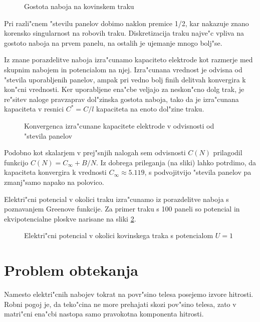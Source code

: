 \documentclass[a4paper,10pt]{article}
\begin{document}
\begin{figure}[H]

\caption{Gostota naboja na kovinskem traku}
\label{fig:trak-naboj-log}
\end{figure}

Pri razli"cnem "stevilu panelov dobimo naklon premice 1/2, kar nakazuje znano korensko singularnost na robovih traku. Diskretizacija traku najve"c vpliva na gostoto naboja na prvem panelu, na ostalih je ujemanje mnogo bolj"se. 

Iz znane porazdelitve naboja izra"cunamo kapaciteto elektrode kot razmerje med skupnim nabojem in potencialom na njej. Izra"cunana vrednost je odvisna od "stevila uporabljenih panelov, ampak pri vedno bolj finih delitvah konvergira k kon"cni vrednosti. Ker uporabljene ena"cbe veljajo za neskon"cno dolg trak, je re"sitev naloge pravzaprav dol"zinska gostota naboja, tako da je izra"cunana kapaciteta v resnici $C^* = C/l$ kapaciteta na enoto dol"zine traku. 

\begin{figure}[H]

\caption{Konvergenca izra"cunane kapacitete elektrode v odvisnosti od "stevila panelov} 
\end{figure}

Podobno kot skalarjem v prej"snjih nalogah sem odvisnosti $C(N)$ prilagodil funkcijo $C(N) = C_\infty + B/N$. Iz dobrega prileganja (na sliki) lahko potrdimo, da kapaciteta konvergira k vrednosti $C_\infty \approx 5.119$, s podvojitvijo "stevila panelov pa zmanj"samo napako na polovico. 

Elektri"cni potencial v okolici traku izra"cunamo iz porazdelitve naboja s poznavanjem Greenove funkcije. Za primer traku s 100 paneli so potencial in ekvipotencialne ploskve narisane na sliki \ref{fig:trak-polje}. 

\begin{figure}[H]

\caption{Elektri"cni potencial v okolici kovinskega traka s potencialom $U = 1$}
\label{fig:trak-polje}
\end{figure}

\section{Problem obtekanja}

Namesto elektri"cnih nabojev tokrat na povr"sino telesa posejemo izvore hitrosti. Robni pogoj je, da teko"cina ne more prehajati skozi pov"sino telesa, zato v matri"cni ena"cbi nastopa samo pravokotna komponenta hitrosti. 
\end{document}

